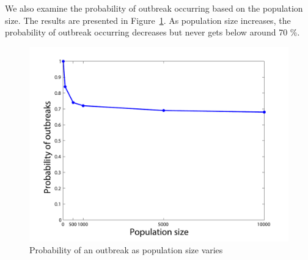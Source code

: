 We also examine the probability of outbreak occurring based on the population size. The results are presented in Figure~\ref{fig:OtbreakProb}. As population size increases, the probability of outbreak occurring decreases but never gets below around 70 \%. 
\begin{figure}[h!]
\begin{center}
\includegraphics[scale=0.5]{OutbreakProb}
\end{center}
\caption{Probability of an outbreak as population size varies}
\label{fig:OtbreakProb}
\end{figure}
